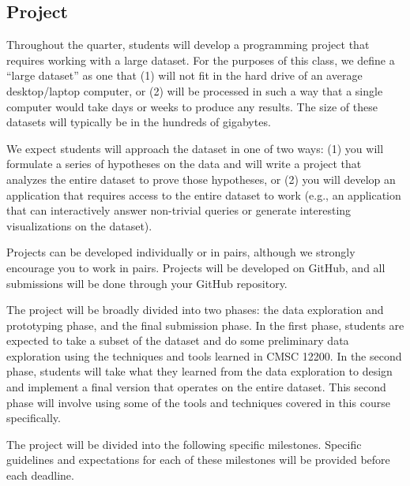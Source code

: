 \documentclass[11pt]{article}
\begin{document}
\subsection{Project}

Throughout the quarter, students will develop a programming project
that requires working with a large dataset. For the purposes of this
class, we define a ``large dataset'' as one that (1) will not
fit in the hard drive of an average desktop/laptop computer, or (2)
will be processed in such a way that a single computer would take
days or weeks to produce any results. The size of these datasets will
typically be in the hundreds of gigabytes.

We expect students will approach the dataset in one of two ways: (1) you
will formulate a series of hypotheses on the data and will write a
project that analyzes the entire dataset to prove those hypotheses, or
(2) you will develop an application that requires access to the
entire dataset to work (e.g., an application that can interactively
answer non-trivial queries or generate interesting visualizations
on the dataset).

Projects can be developed individually or in pairs, although we
strongly encourage you to work in pairs. Projects will be developed 
on GitHub, and all submissions will be done through your
GitHub repository.

The project will be broadly divided into two phases: the data exploration
and prototyping phase, and the final submission phase. In the first
phase, students are expected to take a subset of the dataset and do
some preliminary data exploration using the techniques and tools
learned in CMSC 12200. In the second phase, students will take
what they learned from the data exploration to design and implement
a final version that operates on the entire dataset. This second phase
will involve using some of the tools and techniques covered in this
course specifically.

The project will be divided into the following specific milestones.
Specific guidelines and expectations for each of these milestones
will be provided before each deadline.
\end{document}
